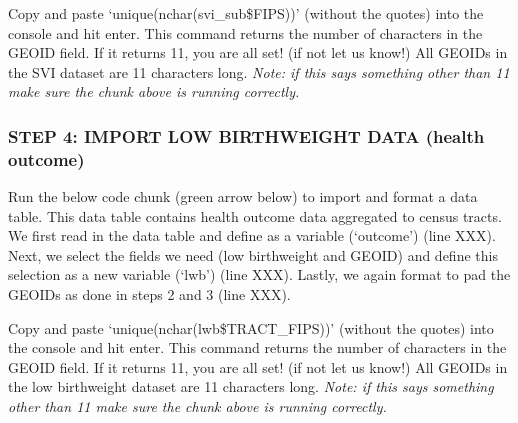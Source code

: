 \documentclass[
  12pt,
]{article}
\newenvironment{Shaded}{\begin{snugshade}}{\end{snugshade}}
\newcommand{\AttributeTok}[1]{\textcolor[rgb]{0.13,0.29,0.53}{#1}}
\newcommand{\CommentTok}[1]{\textcolor[rgb]{0.56,0.35,0.01}{\textit{#1}}}
\newcommand{\DecValTok}[1]{\textcolor[rgb]{0.00,0.00,0.81}{#1}}
\newcommand{\FunctionTok}[1]{\textcolor[rgb]{0.13,0.29,0.53}{\textbf{#1}}}
\newcommand{\NormalTok}[1]{#1}
\newcommand{\OtherTok}[1]{\textcolor[rgb]{0.56,0.35,0.01}{#1}}
\newcommand{\SpecialCharTok}[1]{\textcolor[rgb]{0.81,0.36,0.00}{\textbf{#1}}}
\newcommand{\StringTok}[1]{\textcolor[rgb]{0.31,0.60,0.02}{#1}}
\begin{document}
Copy and paste `unique(nchar(svi\_sub\$FIPS))' (without the quotes) into
the console and hit enter. This command returns the number of characters
in the GEOID field. If it returns 11, you are all set! (if not let us
know!) All GEOIDs in the SVI dataset are 11 characters long. \emph{Note:
if this says something other than 11 make sure the chunk above is
running correctly.}

\hypertarget{step-4-import-low-birthweight-data-health-outcome}{%
\subsubsection{STEP 4: IMPORT LOW BIRTHWEIGHT DATA (health
outcome)}\label{step-4-import-low-birthweight-data-health-outcome}}

Run the below code chunk (green arrow below) to import and format a data
table. This data table contains health outcome data aggregated to census
tracts. We first read in the data table and define as a variable
(`outcome') (line XXX). Next, we select the fields we need (low
birthweight and GEOID) and define this selection as a new variable
(`lwb') (line XXX). Lastly, we again format to pad the GEOIDs as done in
steps 2 and 3 (line XXX).

\begin{Shaded}
\end{Shaded}

Copy and paste `unique(nchar(lwb\$TRACT\_FIPS))' (without the quotes)
into the console and hit enter. This command returns the number of
characters in the GEOID field. If it returns 11, you are all set! (if
not let us know!) All GEOIDs in the low birthweight dataset are 11
characters long. \emph{Note: if this says something other than 11 make
sure the chunk above is running correctly.}
\end{document}
